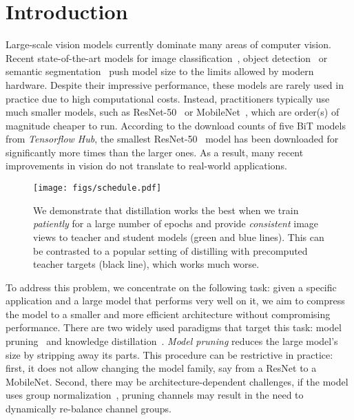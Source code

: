 \documentclass[10pt,twocolumn,letterpaper]{article}
\begin{document}
\section{Introduction}\label{sec:intro} 
Large-scale vision models currently dominate many areas of computer vision. Recent state-of-the-art models for image classification~\cite{brain2020bit,EfficientNet,xie2020self,brain2021vit,MLP}, object detection~\cite{ghiasi2020simple,Swin-L} or semantic segmentation~\cite{zoph2020rethinking} push model size to the limits allowed by modern hardware. Despite their impressive performance, these models are rarely used in practice due to high computational costs.
Instead, practitioners typically use much smaller models, such as ResNet-50~\cite{brain2020bit} or MobileNet~\cite{howard2017mobilenets}, which are order(s) of magnitude cheaper to run. 
According to the download counts of five BiT models from \emph{Tensorflow Hub}, the smallest ResNet-50~\cite{he2016deep} model has been downloaded for significantly more times than the larger ones. 
As a result, many recent improvements in vision do not translate to real-world applications. 

\begin{figure}[t]
\centering
  \texttt{[image: figs/schedule.pdf]}
 \caption{We demonstrate that distillation works the best when we train \textit{patiently} for a large number of epochs and provide \textit{consistent} image views to teacher and student models (green and blue lines). This can be contrasted to a popular setting of distilling with precomputed teacher targets (black line), which works much worse.}
 \end{figure}

To address this problem, we concentrate on the following task: given a specific application and a large model that performs very well on it, we aim to compress the model to a smaller and more efficient architecture without compromising performance. 
There are two widely used paradigms that target this task: model pruning~\cite{janowsky1989pruning} and knowledge distillation~\cite{hinton}. \emph{Model pruning} reduces the large model's size by stripping away its parts. This procedure can be restrictive in practice:
first, it does not allow changing the model family, say from a ResNet to a MobileNet.
Second, there may be architecture-dependent challenges, \eg if the model uses group normalization~\cite{wu2018group}, pruning channels may result in the need to dynamically re-balance channel groups.
\end{document}
